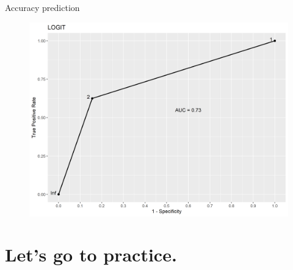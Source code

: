 \documentclass[12pt]{beamer}
\begin{document}
\begin{frame}{Accuracy prediction}
		\small
	\begin{figure}
		\centering
		\includegraphics[width=.8\linewidth]{logit}
	\end{figure}
\end{frame}

\section{Let's go to practice.}



\end{document}
